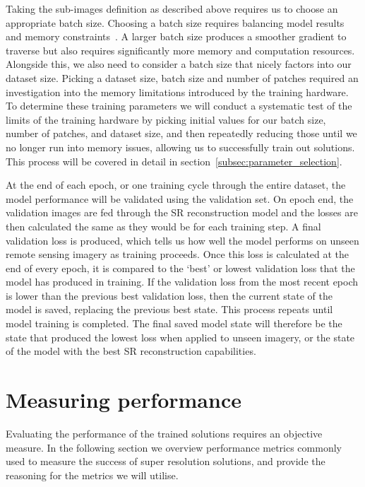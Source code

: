 Taking the sub-images definition as described above requires us to choose an appropriate batch size. Choosing a batch size requires balancing model results and memory constraints~\cite{batchSizeTest}. A larger batch size produces a smoother gradient to traverse but also requires significantly more memory and computation resources. Alongside this, we also need to consider a batch size that nicely factors into our dataset size. Picking a dataset size, batch size and number of patches required an investigation into the memory limitations introduced by the training hardware. To determine these training parameters we will conduct a systematic test of the limits of the training hardware by picking initial values for our batch size, number of patches, and dataset size, and then repeatedly reducing those until we no longer run into memory issues, allowing us to successfully train out solutions. This process will be covered in detail in section~\ref{subsec:parameter_selection}.

At the end of each epoch, or one training cycle through the entire dataset, the model performance will be validated using the validation set. On epoch end, the validation images are fed through the SR reconstruction model and the losses are then calculated the same as they would be for each training step. A final validation loss is produced, which tells us how well the model performs on unseen remote sensing imagery as training proceeds. Once this loss is calculated at the end of every epoch, it is compared to the `best' or lowest validation loss that the model has produced in training. If the validation loss from the most recent epoch is lower than the previous best validation loss, then the current state of the model is saved, replacing the previous best state. This process repeats until model training is completed. The final saved model state will therefore be the state that produced the lowest loss when applied to unseen imagery, or the state of the model with the best SR reconstruction capabilities.

\section{Measuring performance}\label{sec:measuring_performance}
Evaluating the performance of the trained solutions requires an objective measure. In the following section we overview performance metrics commonly used to measure the success of super resolution solutions, and provide the reasoning for the metrics we will utilise.

